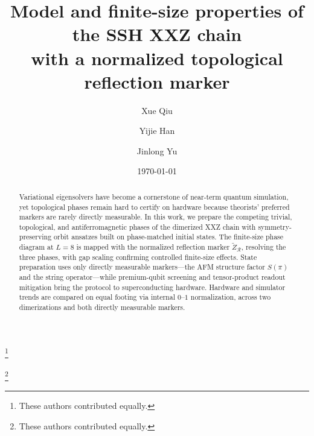 \documentclass[aps,pra,reprint,groupedaddress,floatfix]{revtex4-2}
\begin{document}
\title{Model and finite-size properties of the SSH XXZ chain\\
with a normalized topological reflection marker}

\author{Xue Qiu}\thanks{These authors contributed equally.}
\author{Yijie Han}\thanks{These authors contributed equally.}
\author{Jinlong Yu}

\date{\today}

\begin{abstract}
Variational eigensolvers have become a cornerstone of near-term quantum
simulation, yet topological phases remain hard to certify on hardware
because theorists' preferred markers are rarely directly measurable.
In this work, we prepare the competing trivial, topological, and
antiferromagnetic phases of the dimerized XXZ chain with
symmetry-preserving orbit ansatzes built on phase-matched initial
states. The finite-size phase diagram at $L=8$ is
mapped with the normalized reflection marker $\tilde{Z}_{\mathcal R}$,
resolving the three phases, with gap scaling
confirming controlled finite-size effects. State preparation uses only
directly measurable markers---the AFM structure factor $S(\pi)$ and the
string operator---while premium-qubit screening and tensor-product
readout mitigation bring the protocol to superconducting hardware.
Hardware and simulator trends
are compared on equal footing via internal $0$--$1$ normalization,
across two dimerizations and both directly measurable markers.
\end{abstract}

\maketitle


\FloatBarrier

\FloatBarrier

\FloatBarrier

\FloatBarrier

\FloatBarrier

\FloatBarrier

\FloatBarrier

\FloatBarrier

\FloatBarrier

\FloatBarrier


\FloatBarrier

\end{document}
